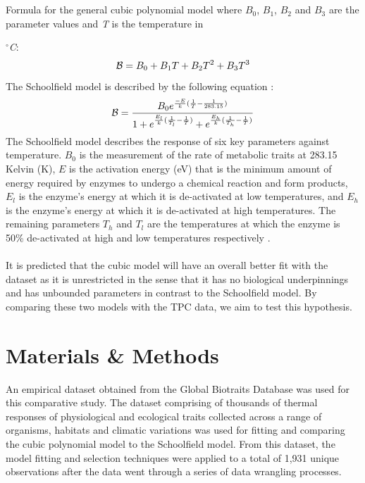 \\~\\
Formula for the general cubic polynomial model where $B_0$, $B_1$, $B_2$ and $B_3$ are the parameter values and {\textit{T}} is the temperature in {\textit{$^{\circ}$C}: 
\begin{equation}
\mathcal B = B_0+B_1T+B_2T^2+B_3T^3\\
\end{equation}
The Schoolfield model is described by the following equation \citep{Schoolfield1981}:
\begin{equation}
\mathcal B = \frac{B_0e^{\frac{-E}{k}(\frac{1}{T}-\frac{1}{283.15})}}{1+e^{\frac{E_l}{k}(\frac{1}{T_l}-\frac{1}{T})}+e^{\frac{E_h}{k}(\frac{1}{T_h}-\frac{1}{T})}}\\
\end{equation}
The Schoolfield model describes the response of six key parameters against temperature. $B_0$ is the measurement of the  rate of metabolic traits at 283.15 Kelvin (K), $E$ is the activation energy (eV) that is the minimum amount of energy required by enzymes to undergo a chemical reaction and form products, $E_l$ is the enzyme's energy at which it is de-activated at low temperatures, and $E_h$ is the enzyme's energy at which it is de-activated at high temperatures. The remaining parameters $T_h$ and $T_l$ are the temperatures at which the enzyme is 50\% de-activated at high and low temperatures respectively \citep{Pawar2016}.  
\\~\\
It is predicted that the cubic model will have an overall better fit with the dataset as it is unrestricted in the sense that it has no biological underpinnings and has unbounded parameters in contrast to the Schoolfield model. By comparing these two models with the TPC data, we aim to test this hypothesis. 

\section*{Materials \& Methods}
An empirical dataset obtained from the Global Biotraits Database \citep{Dell2013} was used for this comparative study. The dataset comprising of thousands of thermal responses of physiological and ecological traits collected across a range of organisms, habitats and climatic variations was used for fitting and comparing the cubic polynomial model to the Schoolfield model. From this dataset, the model fitting and selection techniques were applied to a total of 1,931 unique observations after the data went through a series of data wrangling processes. 


}

